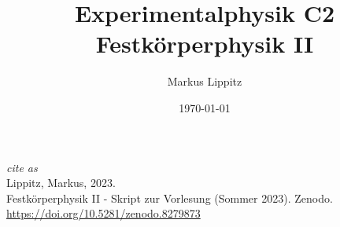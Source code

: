 \documentclass[notoc,nofonts,a4paper,twoside,nobib]{tufte-book}
\newcommand{\kapitelname}{Kapitel\ }
\begin{document}
 
  \tikzexternaldisable


\title{Experimentalphysik C2 \\ Festkörperphysik II}

\author{Markus Lippitz}
\date{\today}


\maketitle


\newpage
\thispagestyle{empty}

\hfill

\vfill

\noindent \textit{cite as}\\
\noindent Lippitz, Markus, 2023.  \\
\noindent Festkörperphysik II - Skript zur Vorlesung (Sommer 2023). Zenodo. \\
\noindent \url{https://doi.org/10.5281/zenodo.8279873}
%
\tableofcontents












 



 

     


\renewcommand{\kapitelname}{Anhang\ }


\appendix
\appendixpage

%
%




%

\printbibliography
\end{document}
